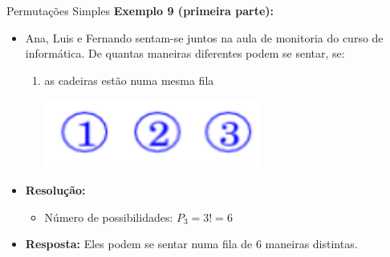 \documentclass[aspectratio=169]{beamer}
\begin{document}
\begin{frame}{Permutações Simples}
    \textbf{Exemplo 9 (primeira parte):}

    \vspace{2mm}

    \begin{itemize}
        \item[] Ana, Luis e Fernando sentam-se juntos na aula de monitoria do curso de informática. De quantas maneiras diferentes podem se sentar, se:
        \begin{enumerate}[(1)]
            \item as cadeiras estão numa mesma fila
            \begin{center}
                \includegraphics[width=0.2\linewidth]{figs/Exemplo9_1.png}
            \end{center}
        \end{enumerate}

        \pause 
        \item[] \textbf{Resolução:}
        \begin{itemize}
            \item[] Número de possibilidades: $P_3 = 3! = 6$
        \end{itemize}
        \item[] \textbf{Resposta:} Eles podem se sentar numa fila de 6 maneiras distintas.
    \end{itemize}
\end{frame}
\end{document}
